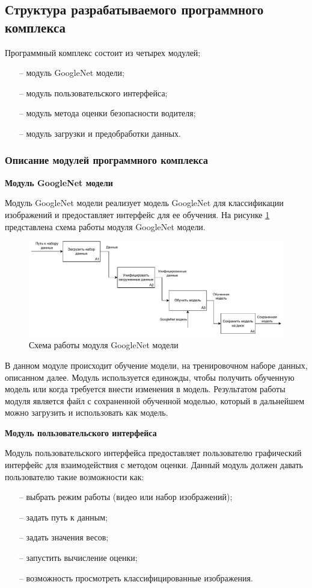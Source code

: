 \subsection{Структура разрабатываемого программного комплекса}
Программный комплекс состоит из четырех модулей;
\begin{itemize}[leftmargin=1.6\parindent]
	\item[--] модуль GoogleNet модели;
	\item[--] модуль пользовательского интерфейса;
	\item[--] модуль метода оценки безопасности водителя;
	\item[--] модуль загрузки и предобработки данных.
\end{itemize}


\subsubsection{Описание модулей программного комплекса}
\textbf{Модуль GoogleNet модели}

Модуль GoogleNet модели реализует модель GoogleNet для классификации изображений и предоставляет интерфейс для ее обучения.
На рисунке \ref{fig:google_net_module} представлена схема работы модуля GoogleNet модели.
\begin{figure}[hbtp]
	\centering
	\includegraphics[scale=0.8]{img/google_net_module_v2.pdf}
	\caption{Схема работы модуля GoogleNet модели}
	\label{fig:google_net_module}
\end{figure}

В данном модуле происходит обучение модели, на тренировочном наборе данных, описанном далее. Модуль используется единожды, чтобы получить обученную модель или когда требуется внести изменения в модель. Результатом работы модуля является файл с сохраненной обученной моделью, который в дальнейшем можно загрузить и использовать как модель.

\textbf{Модуль пользовательского интерфейса}

Модуль пользовательского интерфейса предоставляет пользователю графический интерфейс для взаимодействия с методом оценки. Данный модуль должен давать пользователю такие возможности как: 
\begin{itemize}[leftmargin=1.6\parindent]
	\item[--] выбрать режим работы (видео или набор изображений);
	\item[--] задать путь к данным;
	\item[--] задать значения весов;
	\item[--] запустить вычисление оценки;
	\item[--] возможность просмотреть классифицированные изображения.
\end{itemize}

